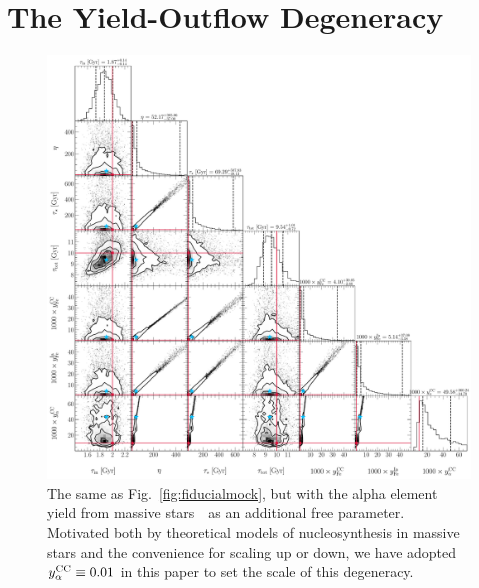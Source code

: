 \documentclass[ms.tex]{subfiles}
\begin{document}
\renewcommand\theequation{\thesection\arabic{equation}}
\renewcommand\thefigure{\thesection\arabic{figure}}
\setcounter{equation}{0}
\setcounter{figure}{0}

\section{The Yield-Outflow Degeneracy}
\label{sec:yield_outflow_degeneracy}

\begin{figure}
\centering
\includegraphics[scale = 0.4]{degeneracy_25k6.pdf}
\caption{
The same as Fig.~\ref{fig:fiducialmock}, but with the alpha element yield from
massive stars~\yacc~as an additional free parameter.
Motivated both by theoretical models of nucleosynthesis in massive stars and
the convenience for scaling up or down, we have adopted~$y_\alpha^\text{CC} \equiv 0.01$
in this paper to set the scale of this degeneracy.
}
\label{fig:degeneracy}
\end{figure}
\end{document}
